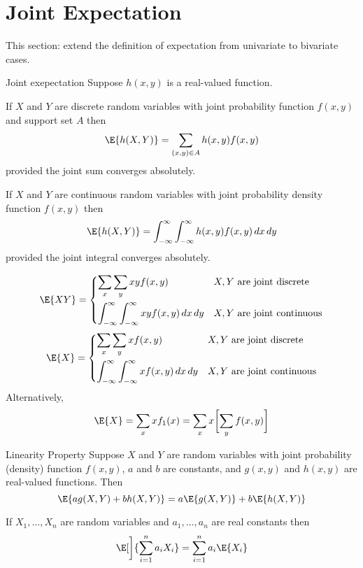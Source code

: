 \section{Joint Expectation}
This section: extend the definition of expectation
from univariate to bivariate cases.
\begin{Definition}{Joint exepectation}{}
    Suppose $ h(x,y) $ is a real-valued function.

    If $ X $ and $ Y $
    are discrete random variables with joint
    probability function $ f(x,y) $ and support set $ A $ then
    \[ \E{h(X,Y)}=\sum_{(x,y)\in A}h(x,y)f(x,y)  \]
    provided the joint sum converges absolutely.

    If $ X $ and $ Y $
    are continuous random variables with joint
    probability density function $ f(x,y) $ then
    \[ \E{h(X,Y)}=\int_{-\infty}^{\infty} \int_{-\infty}^{\infty} h(x,y)f(x,y)\, d{x}\, d{y}   \]
    provided the joint integral converges absolutely.
\end{Definition}
\begin{Example}{}{}
    \[ \E{XY}=\begin{dcases}
            \sum_{x}\sum_{y}xy f(x,y)                                                 & X,Y\text{ are joint discrete}   \\
            \int_{-\infty}^{\infty} \int_{-\infty}^{\infty} x y f(x,y)\, d{x} \, d{y} & X,Y\text{ are joint continuous}
        \end{dcases} \]
    \[ \E{X}=\begin{dcases}
            \sum_{x}\sum_{y}x f(x,y)                                                & X,Y\text{ are joint discrete}   \\
            \int_{-\infty}^{\infty} \int_{-\infty}^{\infty} x f(x,y)\, d{x} \, d{y} & X,Y\text{ are joint continuous}
        \end{dcases} \]
    Alternatively,
    \[ \E{X}=\sum_{x}x f_1(x)=\sum_{x}x\biggl[\sum_{y}f(x,y) \biggr]   \]
\end{Example}
\begin{Proposition}{Linearity Property}{}
    Suppose $ X $ and $ Y $ are random variables
    with joint probability (density) function $ f(x,y) $,
    $ a $ and $ b $ are constants, and $ g(x,y) $
    and $ h(x,y) $ are real-valued functions. Then
    \[ \E{ag(X,Y)+bh(X,Y)}=a\E{g(X,Y)}+b\E{h(X,Y)} \]
\end{Proposition}
\begin{Corollary}{}{}
    If $ X_1,\ldots,X_n $ are random variables
    and $ a_1,\ldots,a_n $ are real constants then
    \[ \E[\bigg]{\sum_{i=1}^{n} a_i X_i}=
        \sum_{i=1}^{n} a_i \E{X_i} \]
\end{Corollary}
